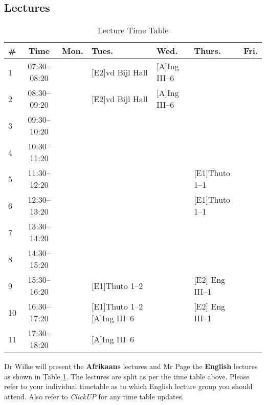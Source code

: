     \subsection{Lectures}
        \begin{table}[!h]
            \begin{center}
             \begin{tabular}{|l|c|p{1.3cm}|p{2.8cm}|p{2.1cm}|p{2.6cm}|p{1.3cm}|}
                 \hline
                 {\bf \#} & {\bf Time} & {\bf Mon.} & {\bf Tues.} & {\bf Wed.} &
                 {\bf Thurs.} & {\bf Fri.} \\
                 \hline
                 1  & 07:30--08:20 &  & [E2]vd Bijl Hall & [A]Ing III--6 &  & \\ \hline
                 2  & 08:30--09:20 &  & [E2]vd Bijl Hall & [A]Ing III--6 &  & \\ \hline
                 3  & 09:30--10:20 &  &  &  &  & \\ \hline
                 4  & 10:30--11:20 &  &  &  &  & \\ \hline
                 5  & 11:30--12:20 &  &  &  & [E1]Thuto 1--1 & \\ \hline
                 6  & 12:30--13:20 &  &  &  & [E1]Thuto 1--1 & \\ \hline
                 7  & 13:30--14:20 &  &  &  &  & \\ \hline
                 8  & 14:30--15:20 &  &  &  &  & \\ \hline
                 9  & 15:30--16:20 &  & [E1]Thuto 1--2 &  & [E2] Eng III--1 & \\ \hline
                 10 & 16:30--17:20 &  & [E1]Thuto 1--2 [A]Ing III--6 &  & [E2] Eng III--1 & \\ \hline
                 11 & 17:30--18:20 &  & [A]Ing III--6 &  &  & \\
                 \hline
             \end{tabular}
             \caption{Lecture Time Table}
            \label{tab:lectures}
            \end{center}
        \end{table}

        Dr Wilke will present the \textbf{Afrikaans} lectures and Mr Page the
        \textbf{English} lectures as shown in Table \ref{tab:lectures}. The
        lectures are split as per the time table above. Please refer to your
        individual timetable as to which English lecture group you should
        attend.  Also refer to {\it ClickUP} for any time table updates.

